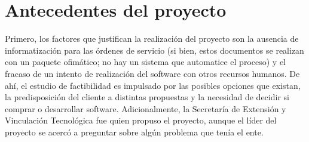 \section[Antecedentes]{Antecedentes del proyecto}
\normalsize{ \indent
Primero, los factores que justifican la realizaci\'on del proyecto
son la ausencia de informatizaci\'on para las \'ordenes de servicio
(si bien, estos documentos se realizan con un paquete ofim\'atico;
no hay un sistema que automatice el proceso) y el fracaso de un
intento de realizaci\'on del software con otros recursos humanos.
De ah\'i, el estudio de factibilidad es impulsado por las posibles
opciones que existan, la predisposici\'on del cliente a distintas
propuestas y la necesidad de decidir si comprar o desarrollar
software.
}
\newline
\normalsize{ \indent
Adicionalmente, la Secretar\'ia de Extensi\'on y Vinculaci\'on
Tecnol\'ogica fue quien propuso el proyecto, aunque el l\'ider del
proyecto se acerc\'o a preguntar sobre alg\'un problema que ten\'ia
el ente.
}
